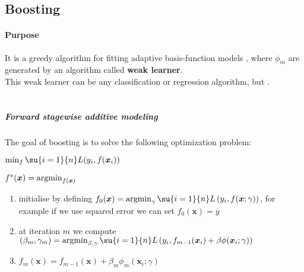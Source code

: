 \subsection{Boosting}
\paragraph{Purpose}
It is a greedy algorithm for fitting adaptive basis-function models , where $\phi_{m}$ are generated by an
algorithm called \textbf{weak learner}. \\
This weak learner can be any classification or regression algorithm, but .\\
\\
\subparagraph{Forward stagewise additive modeling}
The goal of boosting is to solve the following optimization problem:
\begin{center}
    $\min_{f}\su{i=1}{n}L(y_{i},f(\bm{x}_{i}))$
\end{center}
$f^{*}(\bm{x}) = \operatorname*{argmin}_{f(\bm{x})}$

\begin{enumerate}
    \item initialise by defining $f_{0}(\bm{x}) = \argmin_{\gamma}\su{i=1}{n}L\left(
        y_{i},f(\bm{x};\gamma)\right)$, for example if we use squared error we can
        set $f_{0}(\bm{x})=\overline{y}$
    \item at iteration $m$ we compute $(\beta_{m},\gamma_{m}) = \argmin_{\beta,\gamma}
        \su{i=1}{n}L\left(y_{i},f_{m-1}(\bm{x}_{i})+\beta\phi(\bm{x}_{i};\gamma)
        \right)$
    \item $f_{m}(\bm{x}) = f_{m-1}(\bm{x}) + \beta_{m}\phi_{m}(\bm{x}_{i};\gamma)$
\end{enumerate}

